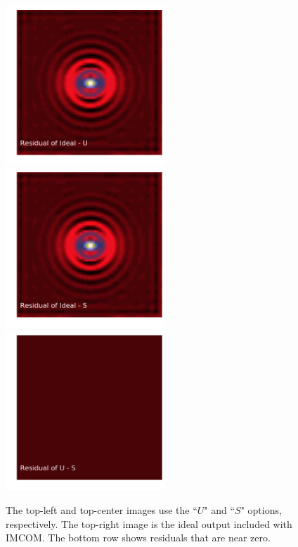 \documentclass[12pt,preprint]{aastex6}
\begin{document}
\begin{figure}[!htbp]
\includegraphics[height=60mm,width=60mm]{f1e.png}
\includegraphics[height=60mm,width=60mm]{f1f.png}
\includegraphics[height=60mm,width=60mm]{f1g.png}
\caption{The top-left and top-center images use the ``$U$" and ``$S$" options, respectively. The top-right image is the ideal output included with IMCOM. The bottom row shows residuals that are near zero.}
\label{fig:varyUandS}
\end{figure}
\end{document}
